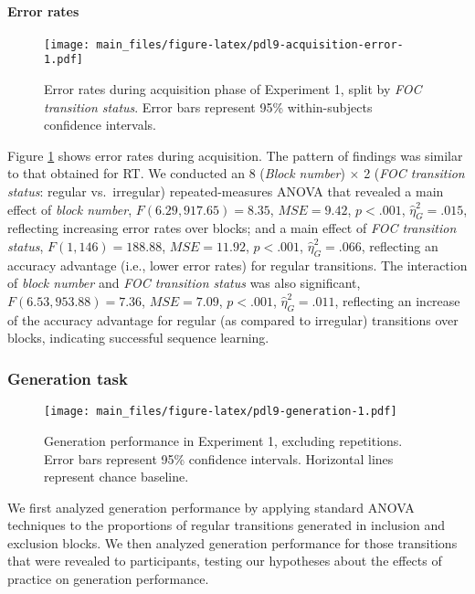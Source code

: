 \documentclass[man]{apa6}
\theoremstyle{definition}
\theoremstyle{definition}
\theoremstyle{definition}
\theoremstyle{remark}
\begin{document}
\paragraph{Error rates}\label{error-rates}

\begin{figure}
\centering
\texttt{[image: main\_files/figure-latex/pdl9-acquisition-error-1.pdf]}
\caption{\label{fig:pdl9-acquisition-error}Error rates during acquisition
phase of Experiment 1, split by \emph{FOC transition status}. Error bars
represent 95\% within-subjects confidence intervals.}
\end{figure}

Figure \ref{fig:pdl9-acquisition-error} shows error rates during
acquisition. The pattern of findings was similar to that obtained for
RT. We conducted an 8 (\emph{Block number}) \(\times\) 2 (\emph{FOC
transition status}: regular vs.~irregular) repeated-measures ANOVA that
revealed a main effect of \emph{block number},
\(F(6.29, 917.65) = 8.35\), \(\mathit{MSE} = 9.42\), \(p < .001\),
\(\hat{\eta}^2_G = .015\), reflecting increasing error rates over
blocks; and a main effect of \emph{FOC transition status},
\(F(1, 146) = 188.88\), \(\mathit{MSE} = 11.92\), \(p < .001\),
\(\hat{\eta}^2_G = .066\), reflecting an accuracy advantage (i.e., lower
error rates) for regular transitions. The interaction of \emph{block
number} and \emph{FOC transition status} was also significant,
\(F(6.53, 953.88) = 7.36\), \(\mathit{MSE} = 7.09\), \(p < .001\),
\(\hat{\eta}^2_G = .011\), reflecting an increase of the accuracy
advantage for regular (as compared to irregular) transitions over
blocks, indicating successful sequence learning.

\subsubsection{Generation task}\label{generation-task}

\begin{figure}
\centering
\texttt{[image: main\_files/figure-latex/pdl9-generation-1.pdf]}
\caption{\label{fig:pdl9-generation}Generation performance in Experiment 1,
excluding repetitions. Error bars represent 95\% confidence intervals.
Horizontal lines represent chance baseline.}
\end{figure}

We first analyzed generation performance by applying standard ANOVA
techniques to the proportions of regular transitions generated in
inclusion and exclusion blocks. We then analyzed generation performance
for those transitions that were revealed to participants, testing our
hypotheses about the effects of practice on generation performance.
\end{document}
